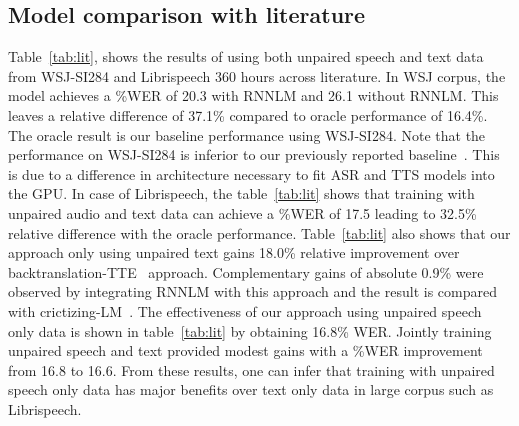 \documentclass[a4paper]{article}
\begin{document}
\subsection{Model comparison with literature}
Table~\ref{tab:lit}, shows the results of using both unpaired speech and text data from WSJ-SI284 and Librispeech 360 hours across literature. In WSJ corpus, the model achieves a \%WER of 20.3 with RNNLM and 26.1 without RNNLM. This leaves a relative difference of 37.1\% compared to oracle performance of 16.4\%. The oracle result is our baseline performance using WSJ-SI284. Note that the performance on WSJ-SI284 is inferior to our previously reported baseline~\cite{baskar2018promising}. This is due to a difference in architecture necessary to fit ASR and TTS models into the GPU.
In case of Librispeech, the table~\ref{tab:lit} shows that training with unpaired audio and text data can achieve a \%WER of 17.5 leading to 32.5\% relative difference with the oracle performance. Table~\ref{tab:lit} also shows that our approach only using unpaired text gains 18.0\% relative improvement over backtranslation-TTE~\cite{hayashi2018back} approach. Complementary gains of absolute 0.9\% were observed by integrating RNNLM with this approach and the result is compared with crictizing-LM~\cite{liuLM}. The effectiveness of our approach using unpaired speech only data is shown in table~\ref{tab:lit} by obtaining 16.8\% WER. Jointly training unpaired speech and text provided modest gains with a \%WER improvement from 16.8 to 16.6. From these results, one can infer that training with unpaired speech only data has major benefits over text only data in large corpus such as Librispeech.
\end{document}
